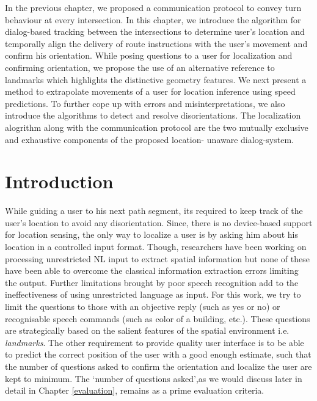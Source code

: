 \documentclass{iitkthesis}
\begin{document}
In the previous chapter, we proposed a communication protocol to convey 
turn behaviour at every intersection. In this chapter, we introduce the 
algorithm for dialog-based tracking between the intersections to 
determine user's location and temporally align the delivery of route 
instructions with the user's movement and confirm his orientation. While 
posing questions to a user for localization and confirming orientation, 
we propose the use of an alternative reference to landmarks which 
highlights the distinctive geometry features. We next present a method to 
extrapolate movements of a user for location inference using speed 
predictions. To further cope up with errors and misinterpretations, we 
also introduce the algorithms to detect and resolve disorientations. The 
localization alogrithm along with the communication protocol are the 
two mutually exclusive and exhaustive components of the proposed location-
unaware dialog-system. 

\section{Introduction} 
While guiding a user to his next path segment, its required to keep track of the user's location to avoid any disorientation. Since, there is no device-based support for location sensing, the only way to localize a user is by asking him about his location in a controlled input format. Though, researchers \cite{tellex:language, Kordjamshidi:labelling, matuszek:following} have been working on processing unrestricted NL input to extract spatial information but none of these have been able to overcome the classical information extraction errors limiting the output. Further limitations brought by poor speech recognition add to the ineffectiveness of using unrestricted language as input. 
For this work, we try to limit the questions to those with an objective reply (such as yes or no) or recognisable speech commands (such as color of a building, etc.). These questions are strategically based on the salient features of the spatial environment i.e. \textit{landmarks}. The other requirement to provide quality user interface is to be able to predict the correct position of the user with a good enough estimate, such that the number of questions asked to confirm the orientation and localize the user are kept to minimum. The `number of questions asked',as we would discuss later in detail in Chapter \ref{evaluation}, remains as a prime evaluation criteria.
\end{document}
